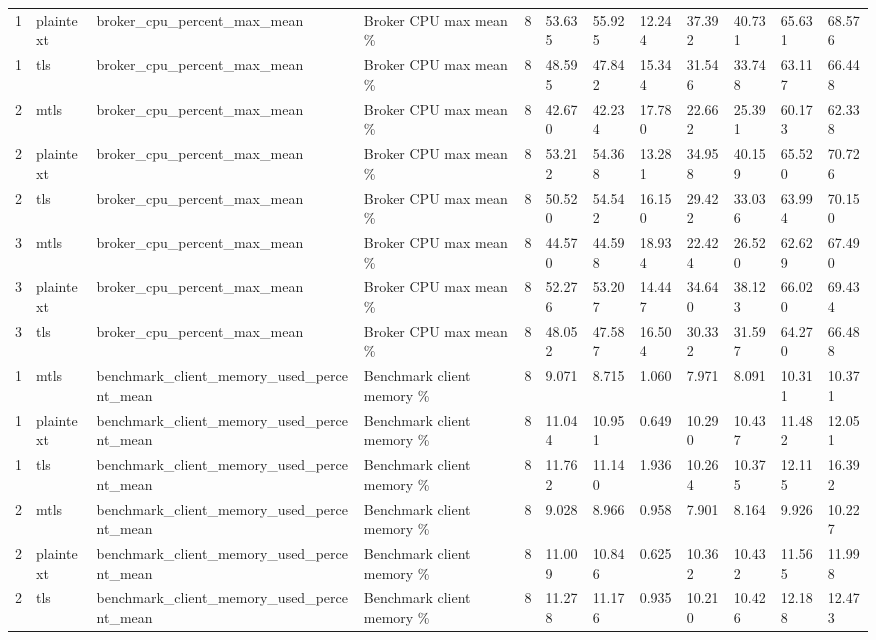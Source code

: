 \begin{longtable}{llllllllllll}
1 & plaintext & broker\_cpu\_percent\_max\_mean & Broker CPU max mean \% & 8 & 53.635 & 55.925 & 12.244 & 37.392 & 40.731 & 65.631 & 68.576 \\
1 & tls & broker\_cpu\_percent\_max\_mean & Broker CPU max mean \% & 8 & 48.595 & 47.842 & 15.344 & 31.546 & 33.748 & 63.117 & 66.448 \\
2 & mtls & broker\_cpu\_percent\_max\_mean & Broker CPU max mean \% & 8 & 42.670 & 42.234 & 17.780 & 22.662 & 25.391 & 60.173 & 62.338 \\
2 & plaintext & broker\_cpu\_percent\_max\_mean & Broker CPU max mean \% & 8 & 53.212 & 54.368 & 13.281 & 34.958 & 40.159 & 65.520 & 70.726 \\
2 & tls & broker\_cpu\_percent\_max\_mean & Broker CPU max mean \% & 8 & 50.520 & 54.542 & 16.150 & 29.422 & 33.036 & 63.994 & 70.150 \\
3 & mtls & broker\_cpu\_percent\_max\_mean & Broker CPU max mean \% & 8 & 44.570 & 44.598 & 18.934 & 22.424 & 26.520 & 62.629 & 67.490 \\
3 & plaintext & broker\_cpu\_percent\_max\_mean & Broker CPU max mean \% & 8 & 52.276 & 53.207 & 14.447 & 34.640 & 38.123 & 66.020 & 69.434 \\
3 & tls & broker\_cpu\_percent\_max\_mean & Broker CPU max mean \% & 8 & 48.052 & 47.587 & 16.504 & 30.332 & 31.597 & 64.270 & 66.488 \\
1 & mtls & benchmark\_client\_memory\_used\_percent\_mean & Benchmark client memory \% & 8 & 9.071 & 8.715 & 1.060 & 7.971 & 8.091 & 10.311 & 10.371 \\
1 & plaintext & benchmark\_client\_memory\_used\_percent\_mean & Benchmark client memory \% & 8 & 11.044 & 10.951 & 0.649 & 10.290 & 10.437 & 11.482 & 12.051 \\
1 & tls & benchmark\_client\_memory\_used\_percent\_mean & Benchmark client memory \% & 8 & 11.762 & 11.140 & 1.936 & 10.264 & 10.375 & 12.115 & 16.392 \\
2 & mtls & benchmark\_client\_memory\_used\_percent\_mean & Benchmark client memory \% & 8 & 9.028 & 8.966 & 0.958 & 7.901 & 8.164 & 9.926 & 10.227 \\
2 & plaintext & benchmark\_client\_memory\_used\_percent\_mean & Benchmark client memory \% & 8 & 11.009 & 10.846 & 0.625 & 10.362 & 10.432 & 11.565 & 11.998 \\
2 & tls & benchmark\_client\_memory\_used\_percent\_mean & Benchmark client memory \% & 8 & 11.278 & 11.176 & 0.935 & 10.210 & 10.426 & 12.188 & 12.473 \\

\end{longtable}

